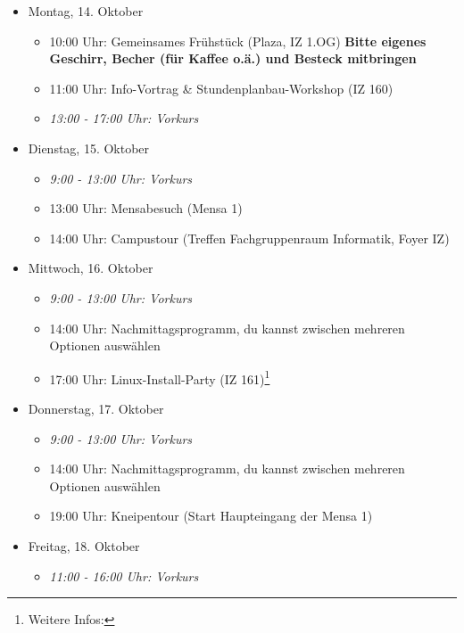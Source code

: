 \begin{itemize}
    \item Montag, 14. Oktober
        \begin{itemize}
            \item 10:00 Uhr: Gemeinsames Frühstück (Plaza, IZ 1.OG) \textbf{Bitte eigenes Geschirr, Becher (für Kaffee o.ä.) und Besteck mitbringen}
            \item 11:00 Uhr: Info-Vortrag \& Stundenplanbau-Workshop (IZ 160)
            \item \textit{13:00 - 17:00 Uhr: Vorkurs}
        \end{itemize}
    \item Dienstag, 15. Oktober
        \begin{itemize}
            \item \textit{9:00 - 13:00 Uhr: Vorkurs}
            \item 13:00 Uhr: Mensabesuch (Mensa 1)
            \item 14:00 Uhr: Campustour (Treffen Fachgruppenraum Informatik, Foyer IZ)
        \end{itemize}
    \item Mittwoch, 16. Oktober
        \begin{itemize}
            \item \textit{9:00 - 13:00 Uhr: Vorkurs}
            \item 14:00 Uhr: Nachmittagsprogramm, du kannst zwischen mehreren Optionen auswählen
            \item 17:00 Uhr: Linux-Install-Party (IZ 161)\footnote{Weitere Infos: }
        \end{itemize}
    \item Donnerstag,  17. Oktober
        \begin{itemize}
            \item \textit{9:00 - 13:00 Uhr: Vorkurs}
            \item 14:00 Uhr: Nachmittagsprogramm, du kannst zwischen mehreren Optionen auswählen
            \item 19:00 Uhr: Kneipentour (Start Haupteingang der Mensa 1)
        \end{itemize}
    \item Freitag, 18. Oktober
        \begin{itemize}
            \item \textit{11:00 - 16:00 Uhr: Vorkurs}
        \end{itemize}

\end{itemize}
